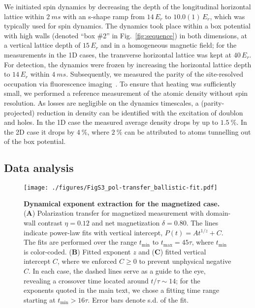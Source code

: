 \documentclass[
 reprint,
 superscriptaddress,
 amsmath,amssymb,
 aps,
 pra,
]{revtex4-2}
\begin{document}
We initiated spin dynamics by decreasing the depth of the longitudinal horizontal lattice within $\SI{2}{ms}$ with an s-shape ramp from $14\,E_r$ to $10.0(1)\,E_r$, which was typically used for spin dynamics.
The dynamics took place within a box potential with high walls (denoted ``box \#2'' in Fig.~\ref{fig:sequence}) in both dimensions, at a vertical lattice depth of $15\,E_r$ and in a homogeneous magnetic field;
for the measurements in the 1D cases, the transverse horizontal lattice was kept at $40\,E_r$.
For detection, the dynamics were frozen by increasing the horizontal lattice depth to $14\,E_r$ within $\SI{4}{ms}$.
Subsequently, we measured the parity of the site-resolved occupation via fluorescence imaging~\cite{Sherson2010}.
To ensure that heating was sufficiently small, we performed a reference measurement of the atomic density without spin resolution.
As losses are negligible on the dynamics timescales, a (parity-projected) reduction in density can be identified with the excitation of doublon and holes.
In the 1D case the measured average density drops by up to $\SI{1.5}{\percent}$. In the 2D case it drops by $\SI{4}{\percent}$, where $\SI{2}{\percent}$ can be attributed to atoms tunnelling out of the box potential.

\subsection{Data analysis}

\begin{figure*}
    \centering
    \texttt{[image: ./figures/FigS3\_pol-transfer\_ballistic-fit.pdf]}
    \caption{\textbf{Dynamical exponent extraction for the magnetized case.}
        (\textbf{A}) Polarization transfer for magnetized measurement with domain-wall contrast $\eta = 0.12$ and net magnetization $\delta = 0.80$. The lines indicate power-law fits with vertical intercept, $P (t) = A t^{1/z} + C$. The fits are performed over the range $t_\mathrm{min}$ to $t_\mathrm{max} = 45 \tau$, where $t_\mathrm{min}$ is color-coded.
        (\textbf{B}) Fitted exponent $z$ and (\textbf{C}) fitted vertical intercept $C$, where we enforced $C \geq 0$ to prevent unphysical negative $C$. In each case, the dashed lines serve as a guide to the eye, revealing a crossover time located around $t/\tau \sim 14$; for the exponents quoted in the main text, we chose a fitting time range starting at $t_\mathrm{min} > 16 \tau$.
        Error bars denote s.d. of the fit.
    }
    \label{fig:pol-transfer-ballistic}
\end{figure*}
\end{document}
